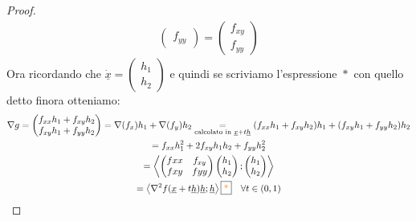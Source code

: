 \documentclass[a4paper, oneside]{article}
\begin{document}
\begin{proof}
\begin{gather*}
\begin{pmatrix}
                    f_{yy}
                \end{pmatrix} = \begin{pmatrix}
                    f_{xy}\\
                    f_{yy}
                \end{pmatrix}
            \end{gather*}
            Ora ricordando che $\dot{\underline{x}} = \begin{pmatrix} h_1 \\ h_2 \end{pmatrix}$ e quindi se scriviamo l'espressione $\boxed{*}$ con quello detto finora otteniamo:
            \begin{gather*}
                \nabla g = \begin{pmatrix}
                    f_{xx} h_1+ f_{xy}h_2\\
                    f_{xy} h_1 + f_{yy}h_2
                \end{pmatrix}
                = \nabla(f_x)h_1 + \nabla(f_y)h_2
            \underset{\text{calcolato in }\underline{x} +t \underline{h}}{=} (f_{xx} h_1 + f_{xy}h_2)h_1 +(f_{xy} h_1 + f_{yy}h_2)h_2\\
            = f_{xx} h_1^2 + 2f_{xy}h_1 h_2 + f_{yy}h_2^2 \\
            = \left\langle \begin{pmatrix}
                f{xx} & f_{xy}\\
                f{xy} & f{yy}
            \end{pmatrix}
            \begin{pmatrix}
                h_1\\h_2
            \end{pmatrix};\begin{pmatrix}
                h_1\\h_2
            \end{pmatrix}\right\rangle \\
            = \left\langle \nabla^2f(\underline{x} + t \underline{h})\underline{h} ; \underline{h}\right\rangle \text{\fbox{\textcolor{orange}{*}}} \quad \forall t \in (0,1)
            \end{gather*}
        \end{proof}
\end{document}
